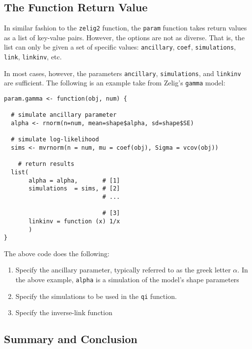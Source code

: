 \documentclass{article}
\newcommand{\code}[1]{{\tt #1}}
\begin{document}
\subsection{The Function Return Value}

In similar fashion to the \code{zelig2} function, the \code{param} function takes return
values as a list of key-value pairs. However, the options are not as diverse. That is, 
the list can only be given a set of specific values: \code{ancillary}, \code{coef},
\code{simulations}, \code{link}, \code{linkinv}, etc.

In most cases, however, the parameters \code{ancillary}, \code{simulations}, and
\code{linkinv} are sufficient. The following is an example take from Zelig's \code{gamma}
model:

\begin{verbatim}
param.gamma <- function(obj, num) {

  # simulate ancillary parameter
  alpha <- rnorm(n=num, mean=shape$alpha, sd=shape$SE)
  
  # simulate log-likelihood
  sims <- mvrnorm(n = num, mu = coef(obj), Sigma = vcov(obj))

	# return results  
  list(
       alpha = alpha,       # [1]
       simulations  = sims, # [2]
                            # ...
                               
                            # [3]
       linkinv = function (x) 1/x
       )
}

\end{verbatim}

The above code does the following:

\begin{enumerate}

	\item Specify the ancillary parameter, typically referred to as the greek letter $\alpha$.
		In the above example, \code{alpha} is a simulation of the model's shape parameters
	
	\item Specify the simulations to be used in the \code{qi} function. 
	
	\item Specify the inverse-link function

\end{enumerate}


\subsection{Summary and Conclusion}
\end{document}
